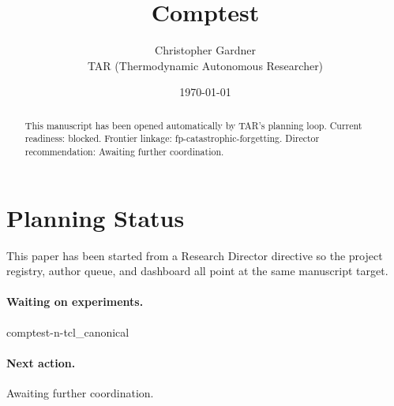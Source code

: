 \documentclass[11pt]{article}
\title{Comptest}
\author{Christopher Gardner \\ TAR (Thermodynamic Autonomous Researcher)}
\date{\today}
\begin{document}
\maketitle

\begin{abstract}
This manuscript has been opened automatically by TAR's planning loop.
Current readiness: blocked. Frontier linkage: fp-catastrophic-forgetting.
Director recommendation: Awaiting further coordination.
\end{abstract}

\section{Planning Status}
This paper has been started from a Research Director directive so the project registry,
author queue, and dashboard all point at the same manuscript target.

\paragraph{Waiting on experiments.}
comptest-n-tcl\_canonical

\paragraph{Next action.}
Awaiting further coordination.
\end{document}
